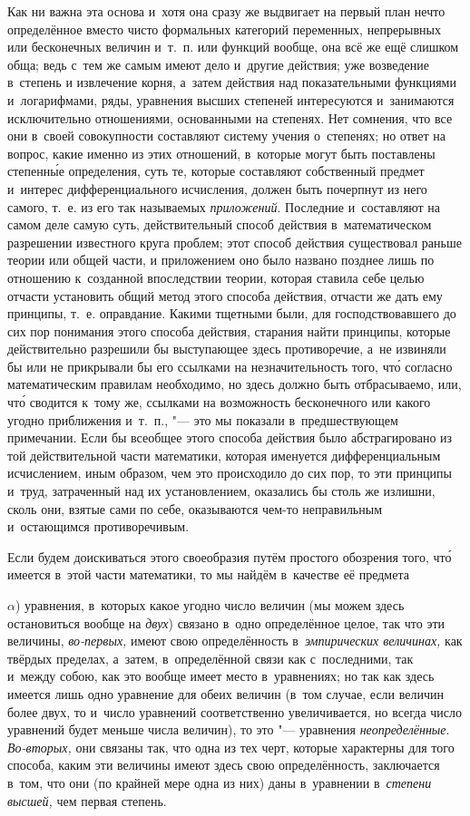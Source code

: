 Как ни важна эта основа и~хотя она сразу же выдвигает на первый план нечто
определённое вместо чисто формальных категорий переменных, непрерывных или
бесконечных величин и~т.~п. или функций вообще, она всё же ещё слишком обща;
ведь с~тем же самым имеют дело и~другие действия; уже возведение в~степень и
извлечение корня, а~затем действия над показательными функциями и~логарифмами,
ряды, уравнения высших степеней интересуются и~занимаются исключительно
отношениями, основанными на степенях. Нет сомнения, что все они в~своей
совокупности составляют систему учения о~степенях; но ответ на вопрос, какие
именно из этих отношений, в~которые могут быть поставлены степенн\'{ы}е
определения, суть те, которые составляют собственный предмет и~интерес
дифференциального исчисления, должен быть почерпнут из него самого, т.~е. из
его так называемых {\em приложений}. Последние и~составляют на самом деле самую
суть, действительный способ действия в~математическом разрешении известного
круга проблем; этот способ действия существовал раньше теории или общей части,
и приложением оно было названо позднее лишь по отношению к~созданной
впоследствии теории, которая ставила себе целью отчасти установить общий метод
этого способа действия, отчасти же дать ему принципы, т.~е. оправдание. Какими
тщетными были, для господствовавшего до сих пор понимания этого способа
действия, старания найти принципы, которые действительно разрешили бы
выступающее здесь противоречие, а~не извиняли бы или не прикрывали бы его
ссылками на незначительность того, чт\'{о} согласно математическим правилам
необходимо, но здесь должно быть отбрасываемо, или, чт\'{о} сводится к~тому же,
ссылками на возможность бесконечного или какого угодно приближения и~т.~п.,
"--- это мы показали в~предшествующем примечании. Если бы всеобщее этого
способа действия было абстрагировано из той действительной части математики,
которая именуется дифференциальным исчислением, иным образом, чем это
происходило до сих пор, то эти принципы и~труд, затраченный над их
установлением, оказались бы столь же излишни, сколь они, взятые сами по себе,
оказываются чем-то неправильным и~остающимся противоречивым.

Если будем доискиваться этого своеобразия путём простого обозрения того,
чт\'{о} имеется в~этой части математики, то мы найдём в~качестве её предмета

$\alpha$) уравнения, в~которых какое угодно число величин (мы можем здесь
остановиться вообще на {\em двух}) связано в~одно определённое целое, так что
эти величины, {\em во-первых,} имеют свою определённость
в~{\em эмпирических величинах,} как твёрдых пределах, а~затем, в~определённой
связи как с~последними, так и~между собою, как это вообще имеет место
в~уравнениях; но так как здесь имеется лишь одно уравнение для обеих величин
(в~том случае, если величин более двух, то и~число уравнений соответственно
увеличивается, но всегда число уравнений будет меньше числа величин), то это
"--- уравнения {\em неопределённые}. {\em Во-вторых,} они связаны так, что одна
из тех черт, которые характерны для того способа, каким эти величины имеют
здесь свою определённость, заключается в~том, что они (по крайней мере одна из
них) даны в~уравнении в~{\em степени высшей,} чем первая степень.

